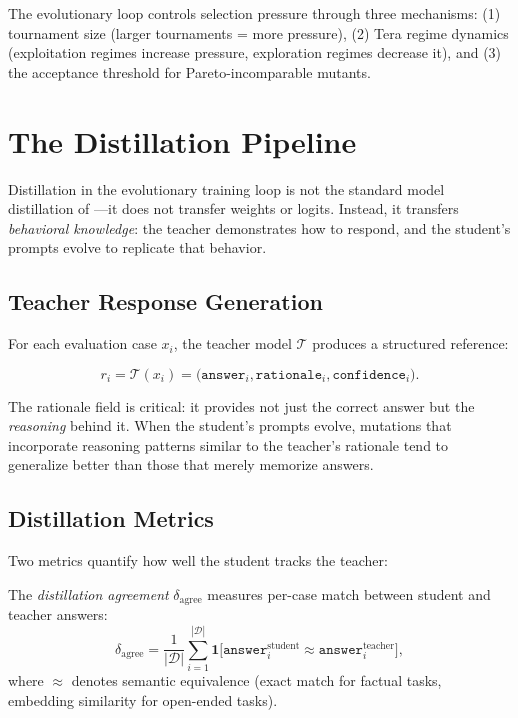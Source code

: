 The evolutionary loop controls selection pressure through three mechanisms: (1) tournament size (larger tournaments = more pressure), (2) Tera regime dynamics (exploitation regimes increase pressure, exploration regimes decrease it), and (3) the acceptance threshold for Pareto-incomparable mutants.

\section{The Distillation Pipeline}
\label{sec:distillation}

Distillation in the evolutionary training loop is not the standard model distillation of \citet{hinton2015}---it does not transfer weights or logits. Instead, it transfers \emph{behavioral knowledge}: the teacher demonstrates how to respond, and the student's prompts evolve to replicate that behavior.

\subsection{Teacher Response Generation}

For each evaluation case $x_i$, the teacher model $\mathcal{T}$ produces a structured reference:

\begin{equation}
r_i = \mathcal{T}(x_i) = \bigl(\texttt{answer}_i, \texttt{rationale}_i, \texttt{confidence}_i\bigr).
\end{equation}

The rationale field is critical: it provides not just the correct answer but the \emph{reasoning} behind it. When the student's prompts evolve, mutations that incorporate reasoning patterns similar to the teacher's rationale tend to generalize better than those that merely memorize answers.

\subsection{Distillation Metrics}

Two metrics quantify how well the student tracks the teacher:

\begin{dogmadef}
The \emph{distillation agreement} $\delta_{\text{agree}}$ measures per-case match between student and teacher answers:
\begin{equation}
\delta_{\text{agree}} = \frac{1}{|\mathcal{D}|} \sum_{i=1}^{|\mathcal{D}|} \mathbf{1}\bigl[\texttt{answer}_i^{\text{student}} \approx \texttt{answer}_i^{\text{teacher}}\bigr],
\end{equation}
where $\approx$ denotes semantic equivalence (exact match for factual tasks, embedding similarity for open-ended tasks).
\end{dogmadef}

